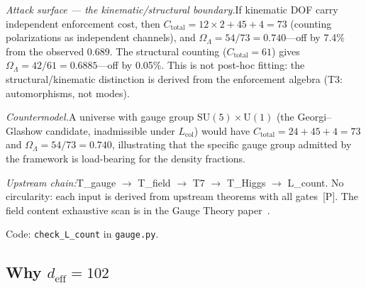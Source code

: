 \documentclass[11pt]{article}
\newcommand{\Ctot}{C_{\mathrm{total}}}
\newcommand{\OmL}{\Omega_\Lambda}
\newcommand{\Lcol}{L_{\mathrm{col}}}
\newcommand{\SU}{\mathrm{SU}}
\newcommand{\U}{\mathrm{U}}
\begin{document}
\textit{Attack surface --- the kinematic/structural boundary.}\quad If kinematic DOF carry independent enforcement cost, then $\Ctot = 12 \times 2 + 45 + 4 = 73$ (counting polarizations as independent channels), and $\OmL = 54/73 = 0.740$---off by 7.4\% from the observed 0.689.  The structural counting ($\Ctot = 61$) gives $\OmL = 42/61 = 0.6885$---off by 0.05\%.  This is not post-hoc fitting: the structural/kinematic distinction is derived from the enforcement algebra (T3: automorphisms, not modes).

\textit{Countermodel.}\quad A universe with gauge group $\SU(5) \times \U(1)$ (the Georgi--Glashow candidate, inadmissible under $\Lcol$) would have $\Ctot = 24 + 45 + 4 = 73$ and $\OmL = 54/73 = 0.740$, illustrating that the specific gauge group admitted by the framework is load-bearing for the density fractions.

\textit{Upstream chain:}\quad T\_gauge $\to$ T\_field $\to$ T7 $\to$ T\_Higgs $\to$ L\_count.  No circularity: each input is derived from upstream theorems with all gates~[P].  The field content exhaustive scan is in the Gauge Theory paper~\cite{PGT}.

Code: \texttt{check\_L\_count} in \texttt{gauge.py}.


\subsection{Why \texorpdfstring{$d_{\mathrm{eff}} = 102$}{deff = 102}}
\end{document}
